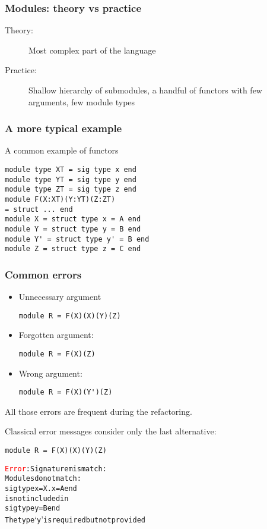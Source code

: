 \documentclass[a4paper,11pt]{beamer}
\newcommand{\error}[1]{\textcolor{red}{#1}}
\begin{document}
\begin{frame}\frametitle{Modules: theory vs practice}
\begin{description}
\item[Theory:]{Most complex part of the language}
\item[Practice:]{Shallow hierarchy of submodules, a handful of functors with few arguments, few module types}
\end{description}

\end{frame}

\begin{frame}[fragile]\frametitle{A more typical example}
A common example of functors
\begin{verbatim}
module type XT = sig type x end
module type YT = sig type y end
module type ZT = sig type z end
module F(X:XT)(Y:YT)(Z:ZT)
= struct ... end
module X = struct type x = A end
module Y = struct type y = B end
module Y' = struct type y' = B end
module Z = struct type z = C end
\end{verbatim}

\end{frame}

\begin{frame}[fragile]\frametitle{Common errors}

  \begin{itemize}
    \item{Unnecessary argument
\begin{verbatim}
module R = F(X)(X)(Y)(Z)
\end{verbatim}
      }
    \item{Forgotten argument:
\begin{verbatim}
module R = F(X)(Z)
\end{verbatim}
      }
    \item{Wrong argument:
\begin{verbatim}
module R = F(X)(Y')(Z)
\end{verbatim}
      }
\end{itemize}

All those errors are frequent during the refactoring.

\end{frame}

\begin{frame}[fragile]
Classical error messages consider only the last alternative:

\begin{verbatim}
module R = F(X)(X)(Y)(Z)
\end{verbatim}

\begin{alltt}
\error{Error}: Signature mismatch:
       Modules do not match:
         sig type x = X.x = A end
       is not included in
         sig type y = B end
       The type `y' is required but not provided
 \end{alltt}
\end{frame}
\end{document}

